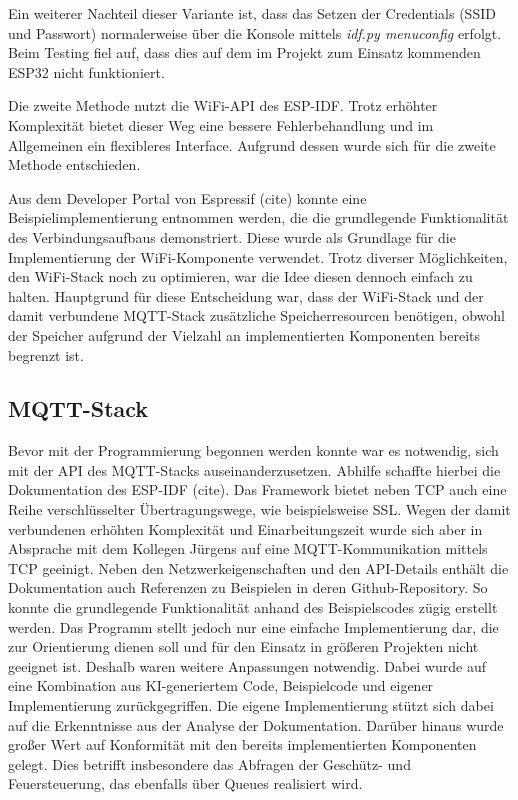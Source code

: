 Ein weiterer Nachteil dieser Variante ist, dass das Setzen der Credentials (SSID und Passwort) normalerweise über die Konsole mittels \textit{idf.py menuconfig} erfolgt. Beim Testing fiel auf, dass dies auf dem im Projekt zum Einsatz kommenden ESP32 nicht funktioniert. \newline

Die zweite Methode nutzt die WiFi-API des ESP-IDF. Trotz erhöhter Komplexität bietet dieser Weg eine bessere Fehlerbehandlung und im Allgemeinen ein flexibleres Interface. Aufgrund dessen wurde sich für die zweite Methode entschieden. \newline

Aus dem Developer Portal von Espressif (cite) konnte eine Beispielimplementierung entnommen werden, die die grundlegende Funktionalität des Verbindungsaufbaus demonstriert. Diese wurde als Grundlage für die Implementierung der WiFi-Komponente verwendet. Trotz diverser Möglichkeiten, den WiFi-Stack noch zu optimieren, war die Idee diesen dennoch einfach zu halten. Hauptgrund für diese Entscheidung war, dass der WiFi-Stack und der damit verbundene MQTT-Stack zusätzliche Speicherresourcen benötigen, obwohl der Speicher aufgrund der Vielzahl an implementierten Komponenten bereits begrenzt ist. \newline

\subsection{MQTT-Stack}

Bevor mit der Programmierung begonnen werden konnte war es notwendig, sich mit der API des MQTT-Stacks auseinanderzusetzen. Abhilfe schaffte hierbei die Dokumentation des ESP-IDF (cite). Das Framework bietet neben TCP auch eine Reihe verschlüsselter Übertragungswege, wie beispielsweise SSL. Wegen der damit verbundenen erhöhten Komplexität und Einarbeitungszeit wurde sich aber in Absprache mit dem Kollegen Jürgens auf eine MQTT-Kommunikation mittels TCP geeinigt. Neben den Netzwerkeigenschaften und den API-Details enthält die Dokumentation auch Referenzen zu Beispielen in deren Github-Repository. So konnte die grundlegende Funktionalität anhand des Beispielscodes zügig erstellt werden. Das Programm stellt jedoch nur eine einfache Implementierung dar, die zur Orientierung dienen soll und für den Einsatz in größeren Projekten nicht geeignet ist. Deshalb waren weitere Anpassungen notwendig. Dabei wurde auf eine Kombination aus KI-generiertem Code, Beispielcode und eigener Implementierung zurückgegriffen. Die eigene Implementierung stützt sich dabei auf die Erkenntnisse aus der Analyse der Dokumentation. Darüber hinaus wurde großer Wert auf Konformität mit den bereits implementierten Komponenten gelegt. Dies betrifft insbesondere das Abfragen der Geschütz- und Feuersteuerung, das ebenfalls über Queues realisiert wird. \newline

